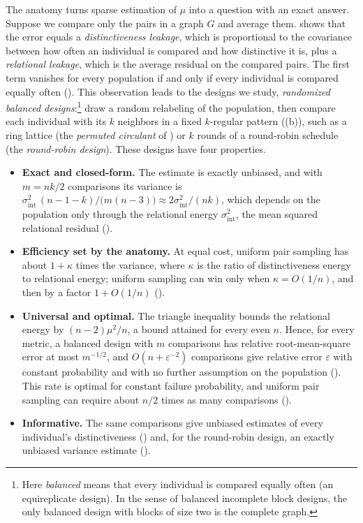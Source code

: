 \documentclass[twoside,11pt]{article}
\newcommand{\sigmaint}{\sigma^2_{\mathrm{int}}}
\begin{document}
The anatomy turns sparse estimation of $\mu$ into a question with an exact
answer. Suppose we compare only the pairs in a graph $G$ and average them.
 shows that the error equals a
\emph{distinctiveness leakage}, which is proportional to the covariance
between how often
an individual is compared and how distinctive it is, plus a
\emph{relational leakage}, which is the average residual on the compared
pairs. The first term vanishes for every population if and only if every
individual is compared equally often (). This
observation leads to the designs we study, \emph{randomized balanced
designs}:\footnote{Here \emph{balanced} means that every individual is
compared equally often (an equireplicate design). In the sense of balanced
incomplete block designs, the only balanced design with blocks of size two
is the complete graph.} draw
a random relabeling of the population, then compare each individual with
its $k$ neighbors in a fixed $k$\nobreakdash-regular pattern
((b)), such as a ring lattice (the \emph{permuted circulant} of
) or $k$ rounds of a round-robin schedule (the
\emph{round-robin design}). These designs have four properties.
\begin{itemize}
  \item \textbf{Exact and closed-form.} The estimate is exactly unbiased,
  and with $m=nk/2$ comparisons its variance is
  $\sigmaint\,(n-1-k)/\bigl(m(n-3)\bigr)\approx2\sigmaint/(nk)$, which
  depends on the population only through the relational energy $\sigmaint$,
  the mean squared relational residual ().
  \item \textbf{Efficiency set by the anatomy.} At equal cost, uniform pair
  sampling has about $1+\kappa$ times the variance, where $\kappa$ is the
  ratio of distinctiveness energy to relational energy; uniform sampling can
  win only when $\kappa=O(1/n)$, and then by a factor $1+O(1/n)$
  ().
  \item \textbf{Universal and optimal.} The triangle inequality bounds the
  relational energy by ${(n-2)\mu^2/n}$, a bound attained for every even $n$.
  Hence, for every metric, a balanced design with $m$ comparisons has relative
  root-mean-square error at most $m^{-1/2}$, and
  ${O(n+\varepsilon^{-2})}$ comparisons give relative error $\varepsilon$
  with constant probability and with no further assumption on the population (). This rate is
  optimal for constant failure probability, and uniform pair sampling can
  require about $n/2$ times as many comparisons ().
  \item \textbf{Informative.} The same comparisons give unbiased estimates
  of every individual's distinctiveness () and,
  for the round-robin design, an exactly unbiased variance estimate
  ().
\end{itemize}
\end{document}
